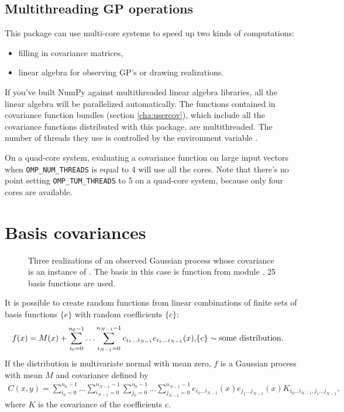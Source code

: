 \subsection{Multithreading GP operations}
This package can use multi-core systems to speed up two kinds of computations:
\begin{itemize}
	\item filling in covariance matrices,
	\item linear algebra for observing GP's or drawing realizations.
\end{itemize}
If you've built NumPy against multithreaded linear algebra libraries, all the linear algebra will be parallelized automatically. The functions contained in covariance function bundles (section \ref{cha:usercov}), which include all the covariance functions distributed with this package, are multithreaded. The number of threads they use is controlled by the environment variable . 

On a quad-core system, evaluating a covariance function on large input vectors when \texttt{OMP_NUM_THREADS} is equal to 4 will use all the cores. Note that there's no point setting \texttt{OMP_TUM_THREADS} to 5 on a quad-core system, because only four cores are available.


\section{Basis covariances}\label{sec:basis}

\begin{figure}[htbp]
    \centering
        \caption{Three realizations of an observed Gaussian process whose covariance is an instance of . The basis in this case is function  from module . 25 basis functions are used.}
    \label{fig:basiscov}
\end{figure}

It is possible to create random functions from linear combinations of finite sets of basis functions $\{e\}$ with random coefficients $\{c\}$:
\begin{eqnarray*}
    f(x) = M(x) + \sum_{i_0=0}^{n_0-1}\ldots \sum_{i_{N-1}=0}^{n_{N-1}-1} c_{i_1\ldots i_{N-1}} e_{i_1\ldots i_{N-1}}(x), &
    \{c\}\sim \textup{some distribution}.
\end{eqnarray*}
If the distribution is multivariate normal with mean zero, $f$ is a Gaussian process with mean $M$ and covariance defined by
\begin{eqnarray*}
    C(x,y)=\sum_{i_0=0}^{n_0-1}\ldots \sum_{i_{N-1}=0}^{n_{N-1}-1} \sum_{j_0=0}^{n_0-1}\ldots \sum_{j_{N-1}=0}^{n_{N-1}-1} e_{i_0\ldots i_{N-1}}(x) e_{j_1\ldots j_{N-1}}(x) K_{i_0\ldots i_{N-1}, j_1\ldots j_{N-1}},
\end{eqnarray*}
where $K$ is the covariance of the coefficients $c$.

